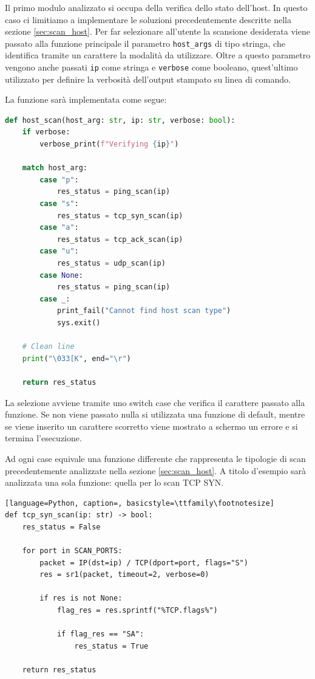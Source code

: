 \documentclass[12pt]{report}
\begin{document}
Il primo modulo analizzato si occupa della verifica dello stato dell'host. In questo caso ci limitiamo a implementare le soluzioni precedentemente descritte nella sezione \ref{sec:scan_host}. Per far selezionare all'utente la scansione desiderata viene passato alla funzione principale il parametro \lstinline{host_args} di tipo stringa, che identifica tramite un carattere la modalità da utilizzare. Oltre a questo parametro vengono anche passati \lstinline{ip} come stringa e \lstinline{verbose} come booleano, quest'ultimo utilizzato per definire la verbosità dell'output stampato su linea di comando.

La funzione sarà implementata come segue:

\begin{lstlisting}[language=Python, caption=Funzione principale per la scansione di host, basicstyle=\ttfamily\footnotesize]
def host_scan(host_arg: str, ip: str, verbose: bool):
    if verbose:
        verbose_print(f"Verifying {ip}")

    match host_arg:
        case "p":
            res_status = ping_scan(ip)
        case "s":
            res_status = tcp_syn_scan(ip)
        case "a":
            res_status = tcp_ack_scan(ip)
        case "u":
            res_status = udp_scan(ip)
        case None:
            res_status = ping_scan(ip)
        case _:
            print_fail("Cannot find host scan type")
            sys.exit()

    # Clean line
    print("\033[K", end="\r")

    return res_status
\end{lstlisting}

La selezione avviene tramite uno switch case che verifica il carattere passato alla funzione. Se non viene passato nulla si utilizzata una funzione di default, mentre se viene inserito un carattere scorretto viene mostrato a schermo un errore e si termina l'esecuzione.

Ad ogni case equivale una funzione differente che rappresenta le tipologie di scan precedentemente analizzate nella sezione \ref{sec:scan_host}. A titolo d'esempio sarà analizzata una sola funzione: quella per lo scan TCP SYN.

\begin{lstlisting}[language=Python, caption=, basicstyle=\ttfamily\footnotesize]
def tcp_syn_scan(ip: str) -> bool:
    res_status = False

    for port in SCAN_PORTS:
        packet = IP(dst=ip) / TCP(dport=port, flags="S")
        res = sr1(packet, timeout=2, verbose=0)

        if res is not None:
            flag_res = res.sprintf("%TCP.flags%")

            if flag_res == "SA":
                res_status = True

    return res_status
\end{lstlisting}
\end{document}
